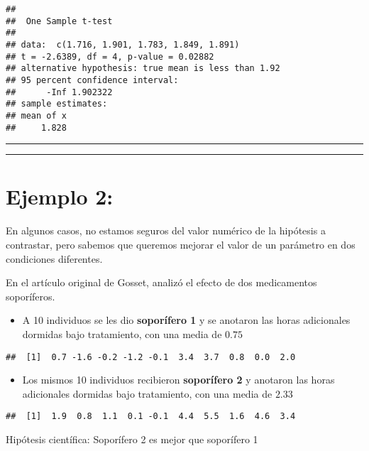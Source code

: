 \documentclass[
]{book}
\providecommand{\tightlist}{%
  \setlength{\itemsep}{0pt}\setlength{\parskip}{0pt}}
\begin{document}
\begin{verbatim}
## 
##  One Sample t-test
## 
## data:  c(1.716, 1.901, 1.783, 1.849, 1.891)
## t = -2.6389, df = 4, p-value = 0.02882
## alternative hypothesis: true mean is less than 1.92
## 95 percent confidence interval:
##      -Inf 1.902322
## sample estimates:
## mean of x 
##     1.828
\end{verbatim}

\begin{center}\rule{0.5\linewidth}{0.5pt}\end{center}

\begin{center}\rule{0.5\linewidth}{0.5pt}\end{center}

\hypertarget{ejemplo-2-3}{%
\section{Ejemplo 2:}\label{ejemplo-2-3}}

En algunos casos, no estamos seguros del valor numérico de la hipótesis a contrastar, pero sabemos que queremos mejorar el valor de un parámetro en dos condiciones diferentes.

En el artículo original de Gosset, analizó el efecto de dos medicamentos soporíferos.

\begin{itemize}
\tightlist
\item
  A 10 individuos se les dio \textbf{soporífero 1} y se anotaron las horas adicionales dormidas bajo tratamiento, con una media de \(0.75\)
\end{itemize}

\begin{verbatim}
##  [1]  0.7 -1.6 -0.2 -1.2 -0.1  3.4  3.7  0.8  0.0  2.0
\end{verbatim}

\begin{itemize}
\tightlist
\item
  Los mismos 10 individuos recibieron \textbf{soporífero 2} y anotaron las horas adicionales dormidas bajo tratamiento, con una media de \(2.33\)
\end{itemize}

\begin{verbatim}
##  [1]  1.9  0.8  1.1  0.1 -0.1  4.4  5.5  1.6  4.6  3.4
\end{verbatim}

Hipótesis científica: Soporífero 2 es mejor que soporífero 1
\end{document}
